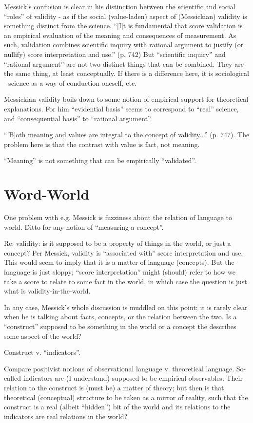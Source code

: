 \documentclass[11pt,twoside]{article}
\begin{document}
Messick's confusion is clear in his distinction between the scientific
and social ``roles'' of validity - as if the social (value-laden)
aspect of (Messickian) validity is something distinct from the
science.  ``[I]t is fundamental that score validation is an empirical
evaluation of the meaning and consequences of measurement.  As such,
validation combines scientific inquiry with rational argument to
justify (or nullify) score interpretation and use.'' (p. 742) But
``scientific inquiry'' and ``rational argument'' are not two distinct
things that can be combined.  They are the same thing, at least
conceptually.  If there is a difference here, it is sociological -
science as a way of conduction oneself, etc.

Messickian validity boils down to some notion of empirical support for
theoretical explanations.  For him ``evidential basis'' seems to
correspond to ``real'' science, and ``consequential basis'' to
``rational argument''.

``[B]oth meaning and values are integral to the concept of
validity...'' (p. 747).  The problem here is that the contrast with
value is fact, not meaning.

``Meaning'' is not something that can be empirically ``validated''.

\section{Word-World}

One problem with e.g. Messick is fuzziness about the relation of
language to world.  Ditto for any notion of ``measuring a concept''.

Re: validity: is it supposed to be a property of things in the world,
or just a concept?  Per Messick, validity is ``associated with'' score
interpretation and use.  This would seem to imply that it is a matter
of language (concepts).  But the language is just sloppy; ``score
interpretation'' might (should) refer to how we take a score to relate
to some fact in the world, in which case the question is just what is
validity-in-the-world.

In any case, Messick's whole discussion is muddled on this point; it
is rarely clear when he is talking about facts, concepts, or the
relation between the two.  Is a ``construct'' supposed to be something
in the world or a concept the describes some aspect of the world?

Construct v. ``indicators''.

Compare positivist notions of observational language v. theoretical
language.  So-called indicators are (I understand) supposed to be
empirical observables.  Their relation to the construct is (must be) a
matter of theory; but then is that theoretical (conceptual) structure
to be taken as a mirror of reality, such that the construct is a real
(albeit ``hidden'') bit of the world and its relations to the
indicators are real relations in the world?
\end{document}
